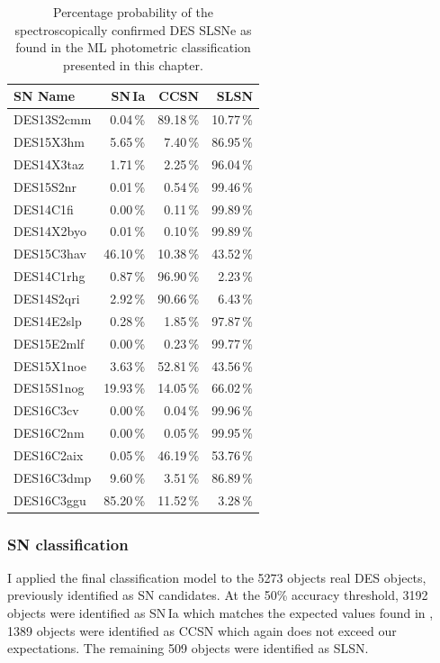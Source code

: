 \begin{table}
  \caption{Percentage probability of the spectroscopically confirmed DES SLSNe as found in the ML photometric classification presented in this chapter.}
  \label{tab:SLSNTruth}
  \centering
  \begin{tabular}{l|r|r|r}
    SN Name & SN\,Ia & CCSN & SLSN \\
    \hline
    DES13S2cmm & 0.04\,\% & 89.18\,\% & 10.77\,\% \\
    DES15X3hm  & 5.65\,\% & 7.40\,\% & 86.95\,\% \\
    DES14X3taz & 1.71\,\% & 2.25\,\% & 96.04\,\% \\
    DES15S2nr  & 0.01\,\% & 0.54\,\% & 99.46\,\% \\
    DES14C1fi  & 0.00\,\% & 0.11\,\% & 99.89\,\% \\
    DES14X2byo & 0.01\,\% & 0.10\,\% & 99.89\,\% \\
    DES15C3hav & 46.10\,\% & 10.38\,\% & 43.52\,\% \\
    DES14C1rhg & 0.87\,\% & 96.90\,\% & 2.23\,\% \\
    DES14S2qri & 2.92\,\% & 90.66\,\% & 6.43\,\% \\
    DES14E2slp & 0.28\,\% & 1.85\,\% & 97.87\,\% \\
    DES15E2mlf & 0.00\,\% & 0.23\,\% & 99.77\,\% \\
    DES15X1noe & 3.63\,\% & 52.81\,\% & 43.56\,\% \\
    DES15S1nog & 19.93\,\% & 14.05\,\% & 66.02\,\% \\
    DES16C3cv  & 0.00\,\% & 0.04\,\% & 99.96\,\% \\
    DES16C2nm  & 0.00\,\% & 0.05\,\% & 99.95\,\% \\
    DES16C2aix & 0.05\,\% & 46.19\,\% & 53.76\,\% \\
    DES16C3dmp & 9.60\,\% & 3.51\,\% & 86.89\,\% \\
    DES16C3ggu & 85.20\,\% & 11.52\,\% & 3.28\,\%
  \end{tabular}
\end{table}

\subsubsection{SN classification}
I applied the final classification model to the 5273 objects real DES objects, previously identified as SN candidates. At the 50\% accuracy threshold, 3192 objects were identified as SN\,Ia which matches the expected values found in \citep{Bernstein2012}, 1389 objects were identified as CCSN which again does not exceed our expectations. The remaining 509 objects were identified as SLSN.

